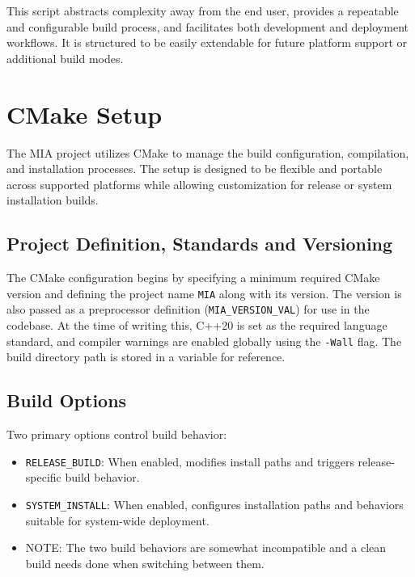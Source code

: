 This script abstracts complexity away from the end user, provides a repeatable and configurable build process, and facilitates both development and deployment workflows. It is structured to be easily extendable for future platform support or additional build modes.















\section{CMake Setup}
\label{sec:CMake-setup}

The MIA project utilizes CMake to manage the build configuration, compilation, and installation processes. The setup is designed to be flexible and portable across supported platforms while allowing customization for release or system installation builds.

\subsection{Project Definition, Standards and Versioning}

The CMake configuration begins by specifying a minimum required CMake version and defining the project name \texttt{MIA} along with its version. The version is also passed as a preprocessor definition (\texttt{MIA\_VERSION\_VAL}) for use in the codebase. At the time of writing this, C++20 is set as the required language standard, and compiler warnings are enabled globally using the \texttt{-Wall} flag. The build directory path is stored in a variable for reference.

\subsection{Build Options}

Two primary options control build behavior:
\begin{itemize}
	\item \texttt{RELEASE\_BUILD}: When enabled, modifies install paths and triggers release-specific build behavior.
	\item \texttt{SYSTEM\_INSTALL}: When enabled, configures installation paths and behaviors suitable for system-wide deployment.
	\item NOTE: The two build behaviors are somewhat incompatible and a clean build needs done when switching between them.
\end{itemize}

